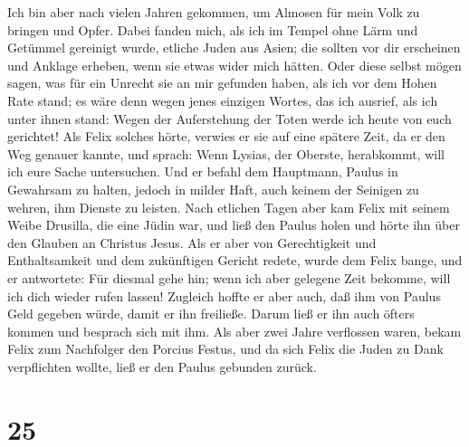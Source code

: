 Ich bin aber nach vielen Jahren gekommen, um Almosen für
mein Volk zu bringen und Opfer.  Dabei fanden mich, als
ich im Tempel ohne Lärm und Getümmel gereinigt wurde, etliche Juden aus
Asien;  die sollten vor dir erscheinen und Anklage
erheben, wenn sie etwas wider mich hätten.  Oder diese
selbst mögen sagen, was für ein Unrecht sie an mir gefunden haben, als
ich vor dem Hohen Rate stand;  es wäre denn wegen jenes
einzigen Wortes, das ich ausrief, als ich unter ihnen stand: Wegen der
Auferstehung der Toten werde ich heute von euch gerichtet!
 Als Felix solches hörte, verwies er sie auf eine spätere
Zeit, da er den Weg genauer kannte, und sprach: Wenn Lysias, der
Oberste, herabkommt, will ich eure Sache untersuchen. 
Und er befahl dem Hauptmann, Paulus in Gewahrsam zu halten, jedoch in
milder Haft, auch keinem der Seinigen zu wehren, ihm Dienste zu leisten.
 Nach etlichen Tagen aber kam Felix mit seinem Weibe
Drusilla, die eine Jüdin war, und ließ den Paulus holen und hörte ihn
über den Glauben an Christus Jesus.  Als er aber von
Gerechtigkeit und Enthaltsamkeit und dem zukünftigen Gericht redete,
wurde dem Felix bange, und er antwortete: Für diesmal gehe hin; wenn ich
aber gelegene Zeit bekomme, will ich dich wieder rufen lassen!
 Zugleich hoffte er aber auch, daß ihm von Paulus Geld
gegeben würde, damit er ihn freiließe. Darum ließ er ihn auch öfters
kommen und besprach sich mit ihm.  Als aber zwei Jahre
verflossen waren, bekam Felix zum Nachfolger den Porcius Festus, und da
sich Felix die Juden zu Dank verpflichten wollte, ließ er den Paulus
gebunden zurück.

\hypertarget{section-24}{%
\section{25}\label{section-24}}

